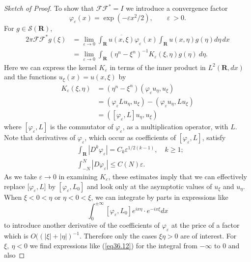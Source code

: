 \documentclass{surv-l}
\theoremstyle{plain}
\theoremstyle{definition}
\numberwithin{equation}{chapter}
\begin{document}
\begin{proof}[Sketch of Proof]
To show that $\mathscr{F}\!\!\mathscr{F}^{*}=I$ we introduce a convergence factor
\begin{equation*}
\varphi_{\varepsilon}(x)=\exp(-\varepsilon x^{2}/2),\qquad \varepsilon\ >0.
\end{equation*}
For $g \in \mathscr{S}(\mathbf{R})$,
\begin{align*}
2\pi \mathscr{F}\!\!\mathscr{F}^{*}g(\xi)&=\lim_{\varepsilon\rightarrow 0}\int_{\mathbf{R}}\overline{u(x,\xi)}\varphi_{\varepsilon}(x)\int_{\mathbf{R}}u(x,\eta)g(\eta)d\eta \, dx\\
&=\lim_{\varepsilon\rightarrow 0}\int_{\mathbf{R}}(\eta^{n}-\xi^{n})^{-1}K_{\varepsilon}(\xi, \eta)g(\eta)\  d\eta.
\end{align*}
Here we can express the kernel $K_{\varepsilon}$ in terms of the inner product in $L^{2} (\mathbf{R}, dx)$ and the functions $u_{\xi}(x)=u(x, \xi)$ by
\begin{align}\label{eq36.11}
K_{\varepsilon}(\xi,\eta)&=(\eta^{n}-\xi^{n})(\varphi_{\varepsilon}u_{\eta}, u_{\xi})\\ \nonumber
&=(\varphi_{\varepsilon}Lu_{\eta}, u_{\xi})-(\varphi_{\varepsilon}u_{\eta}, Lu_{\xi})\\ \nonumber
&=([\varphi_{\varepsilon}, L]u_{\eta}, u_{\xi})
\end{align}
where $[\varphi_{\varepsilon}, L]$ is the commutator of $\varphi_{\varepsilon}$, as a multiplication operator, with $L$. Note that derivatives of $\varphi_{\varepsilon}$, which occur as coefficients of $[\varphi_{\varepsilon}, L]$, satisfy
\begin{align*}
&\int_{\mathbf{R}}|D^{k}\varphi_{\varepsilon}|=C_{k}\varepsilon^{1/2(k-1)},\quad k\geq 1;\\
&\int_{-N}^{N}|D\varphi_{\varepsilon}|\leq C(N)\varepsilon.
\end{align*}
As we take $\varepsilon \rightarrow 0$ in examining $K_{\varepsilon}$, these estimates imply that we can effectively replace [$\varphi_{\varepsilon},L]$ by $[\varphi_{\varepsilon}, L_{0}]$ and look only at the asymptotic values of $u_{\xi}$ and $u_{\eta}$. When $\xi <0<\eta$ or $\eta<0<\xi$, we can integrate by parts in expressions like
\begin{equation}\label{eq36.12}
\int_{0}^{\pm\infty}[\varphi_{\varepsilon}, L_{0}]e^{ix\eta}\cdot e^{-ix\xi}dx
\end{equation}
to introduce another derivative of the coefficients of $\varphi_{\varepsilon}$ at the price of a factor which is $O((|\xi|+|\eta|)^{-1}$. Therefore only the cases $\xi\eta>0$ are of interest. For $\xi,\ \eta<0$ we find expressions like (\ref{eq36.12}) for the integral from $-\infty$ to $0$ and also

\end{proof}
\end{document}
